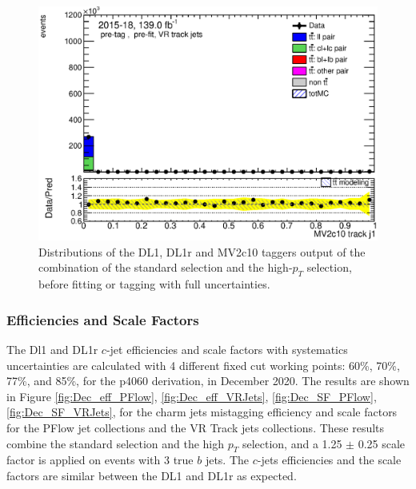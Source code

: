 \documentclass[letterpaper,12pt]{article}
\begin{document}
\begin{figure}[h]
\begin{minipage}[b]{.45\textwidth}
	\includegraphics[width=1\textwidth]{Oct_distributions/pretagNoRwDL1rwithhighpTVRJets_scaledall/DataMC_J1_MV2c10.eps}
	\end{minipage}
	\caption{Distributions of the DL1, DL1r and MV2c10 taggers output of 
	the combination of the standard selection and the high-$p_T$ selection, 
	before fitting or tagging with full uncertainties.} \label{fig:taggers_VRJets}
	\end{figure}	

\subsubsection{Efficiencies and Scale Factors}

The Dl1 and DL1r $c$-jet efficiencies and scale factors with systematics 
uncertainties are calculated with 4 different fixed cut working points: 
60\%, 70\%, 77\%, and 85\%, for the p4060 derivation, in December 2020. 
The results are shown in Figure \ref{fig:Dec_eff_PFlow}, \ref{fig:Dec_eff_VRJets}, 
\ref{fig:Dec_SF_PFlow}, \ref{fig:Dec_SF_VRJets}, for the charm jets mistagging efficiency 
and scale factors for the PFlow jet collections and the VR Track jets collections. 
These results combine the standard selection and the high $p_T$ selection, 
and a 1.25 $\pm$ 0.25 scale factor is applied on events with 3 true $b$ jets. 
The $c$-jets efficiencies and the scale factors are similar between the DL1 and DL1r as expected. 
\end{document}

